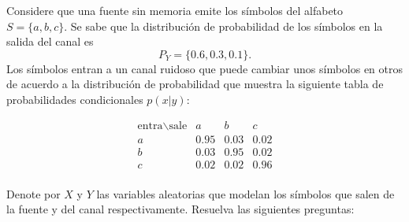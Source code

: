 Considere que una fuente sin memoria emite los símbolos del alfabeto $S = \{a, b, c\}$. Se sabe que la distribución de probabilidad de los símbolos en la salida del canal es 
\[
P_Y = \{0\text{.}6, 0\text{.}3, 0\text{.}1\}.
\]
Los símbolos entran a un canal ruidoso que puede cambiar unos símbolos en otros de acuerdo a la distribución de probabilidad que muestra la siguiente tabla de probabilidades condicionales $p(x|y)$:

\[
\begin{array}{c|ccc}
\text{entra} \backslash \text{sale} & a & b & c \\
\hline
a & 0\text{.}95 & 0\text{.}03 & 0\text{.}02 \\
b & 0\text{.}03 & 0\text{.}95 & 0\text{.}02 \\
c & 0\text{.}02 & 0\text{.}02 & 0\text{.}96 \\
\end{array}
\]

Denote por $X$ y $Y$ las variables aleatorias que modelan los símbolos que salen de la fuente y del canal respectivamente. Resuelva las siguientes preguntas:

